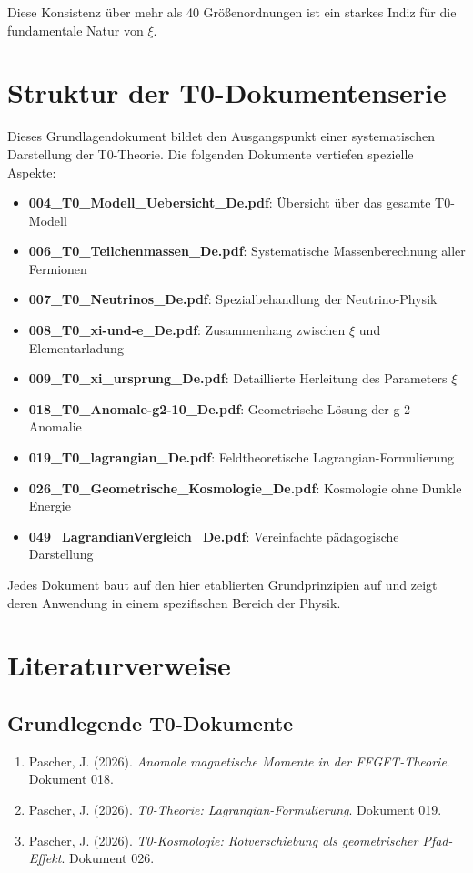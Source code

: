\documentclass[12pt,a4paper]{article}
\begin{document}
	Diese Konsistenz über mehr als 40 Größenordnungen ist ein starkes Indiz für die fundamentale Natur von $\xi$.
	
	\section{Struktur der T0-Dokumentenserie}
	
	Dieses Grundlagendokument bildet den Ausgangspunkt einer systematischen Darstellung der T0-Theorie. Die folgenden Dokumente vertiefen spezielle Aspekte:
	
	\begin{itemize}
		\item \textbf{004\_T0\_Modell\_Uebersicht\_De.pdf}: Übersicht über das gesamte T0-Modell
		\item \textbf{006\_T0\_Teilchenmassen\_De.pdf}: Systematische Massenberechnung aller Fermionen
		\item \textbf{007\_T0\_Neutrinos\_De.pdf}: Spezialbehandlung der Neutrino-Physik
		\item \textbf{008\_T0\_xi-und-e\_De.pdf}: Zusammenhang zwischen $\xi$ und Elementarladung
		\item \textbf{009\_T0\_xi\_ursprung\_De.pdf}: Detaillierte Herleitung des Parameters $\xi$
		\item \textbf{018\_T0\_Anomale-g2-10\_De.pdf}: Geometrische Lösung der g-2 Anomalie
		\item \textbf{019\_T0\_lagrangian\_De.pdf}: Feldtheoretische Lagrangian-Formulierung
		\item \textbf{026\_T0\_Geometrische\_Kosmologie\_De.pdf}: Kosmologie ohne Dunkle Energie
		\item \textbf{049\_LagrandianVergleich\_De.pdf}: Vereinfachte pädagogische Darstellung
	\end{itemize}
	
	Jedes Dokument baut auf den hier etablierten Grundprinzipien auf und zeigt deren Anwendung in einem spezifischen Bereich der Physik.
	
	\section{Literaturverweise}
	
	\subsection{Grundlegende T0-Dokumente}
	
	\begin{enumerate}
		\item Pascher, J. (2026). \textit{Anomale magnetische Momente in der FFGFT-Theorie}. Dokument 018.
		\item Pascher, J. (2026). \textit{T0-Theorie: Lagrangian-Formulierung}. Dokument 019.
		\item Pascher, J. (2026). \textit{T0-Kosmologie: Rotverschiebung als geometrischer Pfad-Effekt}. Dokument 026.
	\end{enumerate}
	
\end{document}
